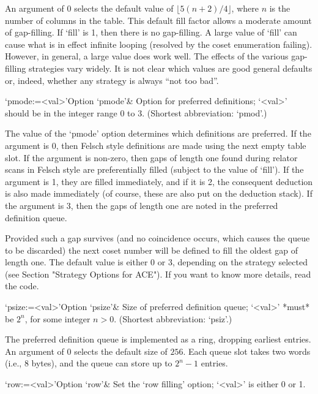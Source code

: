 An  argument of  0  selects  the default  value  of $\lfloor  5(n+2)/4
\rfloor$,  where $n$  is the  number of  columns in  the  table.  This
default  fill factor  allows  a moderate  amount  of gap-filling.   If
`fill' is  1, then there is  no gap-filling.  A large  value of `fill'
can cause  what is in effect  infinite looping (resolved  by the coset
enumeration failing).   However, in general,  a large value  does work
well.  The  effects of the various gap-filling  strategies vary widely.
It is  not clear  which values are  good general defaults  or, indeed,
whether any strategy is always ``not too bad''.

\>`pmode:=<val>'{Option `pmode'}&
Option for preferred definitions;  `<val>' should be in the integer
range 0 to 3. (Shortest abbreviation: `pmod'.)

The  value of  the  `pmode' option  determines  which definitions  are
preferred.  If  the argument is  0, then Felsch style  definitions are
made using  the next empty table  slot.  If the  argument is non-zero,
then gaps of length one found during relator scans in Felsch style are
preferentially  filled  (subject to  the  value  of  `fill').  If  the
argument  is 1,  they are  filled  immediately, and  if it  is 2,  the
consequent deduction  is also made  immediately (of course,  these are
also put on the deduction stack).  If the argument is 3, then the gaps
of length one are noted in the preferred definition queue.

Provided such a gap survives (and no coincidence occurs, which  causes
the queue to be discarded) the next coset number will  be  defined  to
fill the oldest gap of length one. The default value is either 0 or 3,
depending on the strategy selected (see Section "Strategy Options  for
ACE"). If you want to know more details, read the code.


\>`psize:=<val>'{Option `psize'}&
Size of preferred definition queue; `<val>' *must*  be $2^n$, for some
integer $n>0$. (Shortest abbreviation: `psiz'.)

The  preferred definition  queue is  implemented as  a  ring, dropping
earliest entries. An argument of 0 selects  the default size of $256$.
Each  queue slot takes two words (i.e., 8 bytes),  and the  queue  can
store up to $2^n-1$ entries.


\>`row:=<val>'{Option `row'}&
Set the \lq{}row filling' option; `<val>' is either 0 or 1.

